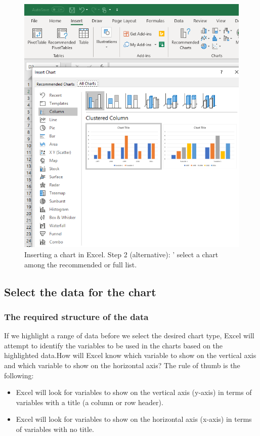 \documentclass[]{book}
\providecommand{\tightlist}{%
  \setlength{\itemsep}{0pt}\setlength{\parskip}{0pt}}
\begin{document}
\begin{figure}

{\centering \includegraphics[width=0.6\linewidth]{_resources/chapter_excelbasic/i3} 

}

\caption{Inserting a chart in Excel. Step 2 (alternative): ' select a chart among the recommended or full list.}\label{fig:ex23}
\end{figure}

\hypertarget{select-the-data-for-the-chart}{%
\subsection{Select the data for the chart}\label{select-the-data-for-the-chart}}

\hypertarget{the-required-structure-of-the-data}{%
\subsubsection*{The required structure of the data}\label{the-required-structure-of-the-data}}

If we highlight a range of data before we select the desired chart type, Excel will attempt to identify the variables to be used in the charts based on the highlighted data.How will Excel know which variable to show on the vertical axis and which variable to show on the horizontal axis? The rule of thumb is the following:

\begin{itemize}
\tightlist
\item
  Excel will look for variables to show on the vertical axis (y-axis) in terms of variables with a title (a column or row header).
\item
  Excel will look for variables to show on the horizontal axis (x-axis) in terms of variables with no title.
\end{itemize}
\end{document}

